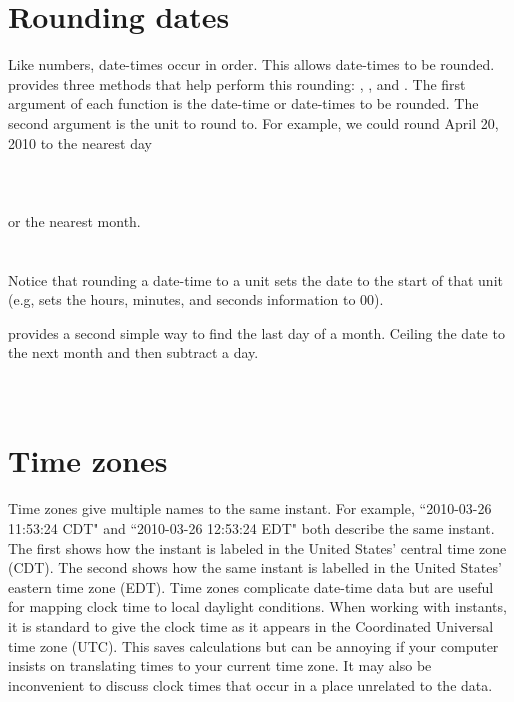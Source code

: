 \documentclass[article]{jss}
\begin{document}
\section{Rounding dates}
\label{sec:rounding}
Like numbers, date-times occur in order. This allows date-times to be rounded.  provides three methods that help perform this rounding: , , and . The first argument of each function is the date-time or date-times to be rounded. The second argument is the unit to round to. For example, we could round April 20, 2010 to the nearest day\\

\\
\\
\\

or the nearest month.\\

\\
\\

Notice that rounding a date-time to a unit sets the date to the start of that unit (e.g,  sets the hours, minutes, and seconds information to 00).


 provides a second simple way to find the last day of a month. Ceiling the date to the next month and then subtract a day.\\

\\
\\


\section{Time zones}
\label{sec:tz}

Time zones give multiple names to the same instant. For example, ``2010-03-26 11:53:24 CDT" and ``2010-03-26 12:53:24 EDT" both describe the same instant. The first shows how the instant is labeled in the United States' central time zone (CDT). The second shows how the same instant is labelled in the United States' eastern time zone (EDT). Time zones complicate date-time data but are useful for mapping clock time to local daylight conditions. When working with instants, it is standard to give the clock time as it appears in the Coordinated Universal time zone (UTC).  This saves calculations but can be annoying if your computer insists on translating times to your current time zone.  It may also be inconvenient to discuss clock times that occur in a place unrelated to the data.
\end{document}
